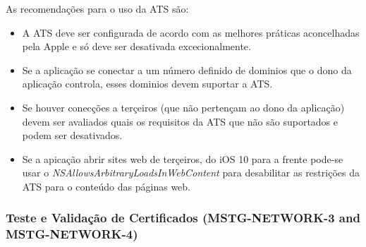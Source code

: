 As recomendações para o uso da ATS são:
\begin{itemize}
\item A ATS deve ser configurada de acordo com as melhores práticas aconcelhadas pela Apple e só deve ser desativada excecionalmente.\par
\hfill\par
\item Se a aplicação se conectar a um número definido de dominios que o dono da aplicação controla, esses dominios devem suportar a ATS.\par
\hfill\par
\item Se houver conecções a terçeiros (que não pertençam ao dono da aplicação) devem ser avaliados quais os requisitos da ATS que não são suportados e podem ser desativados.\par
\hfill\par
\item Se a apicação abrir sites web de terçeiros, do iOS 10 para a frente pode-se usar o \textit{NSAllowsArbitraryLoadsInWebContent} para desabilitar as restrições da ATS para o conteúdo das páginas web.
\end{itemize}

\subsubsection{Teste e Validação de Certificados (MSTG-NETWORK-3 and MSTG-NETWORK-4)}
\hfill\par
\hfill\par

